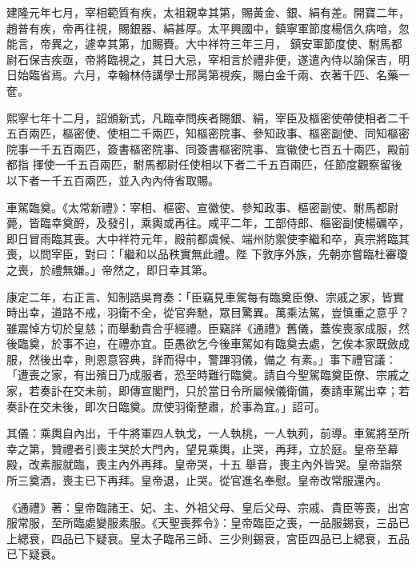 \begin{pinyinscope}
 建隆元年七月，宰相範質有疾，太祖親幸其第，賜黃金、銀、絹有差。開寶二年，趙普有疾，帝再往視，賜銀器、絹甚厚。太平興國中，鎮寧軍節度楊信久病喑，忽能言，帝異之，遽幸其第，加賜賚。大中祥符三年三月，
 鎮安軍節度使、駙馬都尉石保吉疾亟，帝將臨視之，其日大忌，宰相言於禮非便，遂遣內侍以諭保吉，明日始臨省焉。六月，幸翰林侍講學士邢昺第視疾，賜白金千兩、衣著千匹、名藥一奩。



 熙寧七年十二月，詔頒新式，凡臨幸問疾者賜銀、絹，宰臣及樞密使帶使相者二千五百兩匹，樞密使、使相二千兩匹，知樞密院事、參知政事、樞密副使、同知樞密院事一千五百兩匹，簽書樞密院事、同簽書樞密院事、宣徽使七百五十兩匹，殿前都指
 揮使一千五百兩匹，駙馬都尉任使相以下者二千五百兩匹，任節度觀察留後以下者一千五百兩匹，並入內內侍省取賜。



 車駕臨奠。《太常新禮》：宰相、樞密、宣徽使、參知政事、樞密副使、駙馬都尉薨，皆臨幸奠酹，及發引，乘輿或再往。咸平二年，工部侍郎、樞密副使楊礪卒，即日冒雨臨其喪。大中祥符元年，殿前都虞候、端州防禦使李繼和卒，真宗將臨其喪，以問宰臣，對曰：「繼和以品秩實無此禮。陛
 下敦序外族，先朝亦嘗臨杜審瓊之喪，於禮無嫌。」帝然之，即日幸其第。



 康定二年，右正言、知制誥吳育奏：「臣竊見車駕每有臨奠臣僚、宗戚之家，皆實時出幸，道路不戒，羽衛不全，從官奔馳，眾目驚異。萬乘法駕，豈慎重之意乎？雖震悼方切於皇慈；而舉動貴合乎經禮。臣竊詳《通禮》舊儀，蓋俟喪家成服，然後臨奠，於事不迫，在禮亦宜。臣愚欲乞今後車駕如有臨奠去處，乞俟本家既斂成服，然後出幸，則恩意容典，詳而得中，警蹕羽儀，備之
 有素。」事下禮官議：「遭喪之家，有出殯日乃成服者，恐至時難行臨奠。請自今聖駕臨奠臣僚、宗戚之家，若奏訃在交未前，即傳宣閣門，只於當日令所屬候儀衛備，奏請車駕出幸；若奏訃在交未後，即次日臨奠。庶使羽衛整肅，於事為宜。」詔可。



 其儀：乘輿自內出，千牛將軍四人執戈，一人執桃，一人執茢，前導。車駕將至所幸之第，贊禮者引喪主哭於大門內，望見乘輿，止哭，再拜，立於庭。皇帝至幕殿，改素服就臨，喪主內外再拜。皇帝哭，十五
 舉音，喪主內外皆哭。皇帝詣祭所三奠酒，喪主已下再拜。皇帝退，止哭。從官進名奉慰。皇帝改常服還內。



 《通禮》著：皇帝臨諸王、妃、主、外祖父母、皇后父母、宗戚、貴臣等喪，出宮服常服，至所臨處變服素服。《天聖喪葬令》：皇帝臨臣之喪，一品服錫衰，三品已上緦衰，四品已下疑衰。皇太子臨吊三師、三少則錫衰，宮臣四品已上緦衰，五品已下疑衰。




\end{pinyinscope}
